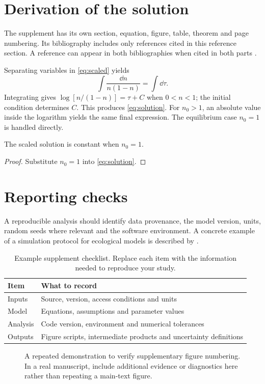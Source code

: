 \section{Derivation of the solution}\label{sec:supp-derivation}
The supplement has its own section, equation, figure, table, theorem and page numbering. Its bibliography includes only references cited in this reference section. A reference can appear in both bibliographies when cited in both parts \citep{lotka1925}.

Separating variables in \cref{eq:scaled} yields
\begin{equation}\label{eq:supp-integral}
  \int\frac{\dd n}{n(1-n)}=\int\dd\tau.
\end{equation}
Integrating gives $\log[n/(1-n)]=\tau+C$ when $0<n<1$; the initial condition determines $C$. This produces \cref{eq:solution}. For $n_0>1$, an absolute value inside the logarithm yields the same final expression. The equilibrium case $n_0=1$ is handled directly.

\begin{lemma}\label{lemma:supp}
The scaled solution is constant when $n_0=1$.
\end{lemma}
\begin{proof}
Substitute $n_0=1$ into \cref{eq:solution}.
\end{proof}

\section{Reporting checks}\label{sec:supp-checks}
A reproducible analysis should identify data provenance, the model version, units, random seeds where relevant and the software environment. A concrete example of a simulation protocol for ecological models is described by \citet{grimm2006}.
\begin{table}[htbp]
\caption{Example supplement checklist. Replace each item with the information needed to reproduce your study.}\label{tab:supp}
\begin{tabularx}{\linewidth}{@{}lX@{}}\toprule
Item & What to record\\\midrule
Inputs & Source, version, access conditions and units\\
Model & Equations, assumptions and parameter values\\
Analysis & Code version, environment and numerical tolerances\\
Outputs & Figure scripts, intermediate products and uncertainty definitions\\\bottomrule
\end{tabularx}
\end{table}
\begin{figure}[htbp]
\centering
\caption{A repeated demonstration to verify supplementary figure numbering. In a real manuscript, include additional evidence or diagnostics here rather than repeating a main-text figure.}\label{fig:supp}
\end{figure}
